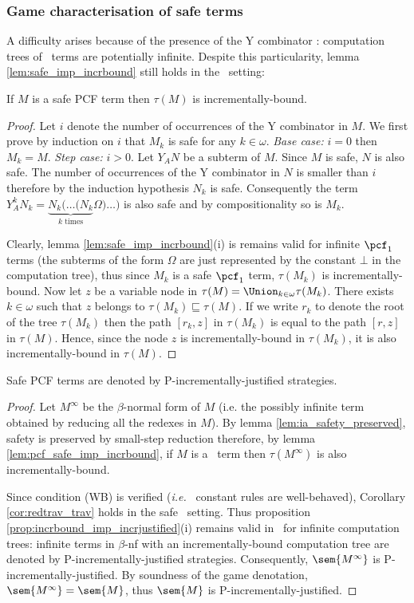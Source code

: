 \subsubsection{Game characterisation of safe terms}

A difficulty arises because of the presence of the Y combinator :
computation trees of \pcf\ terms are potentially infinite. Despite
this particularity, lemma \ref{lem:safe_imp_incrbound} still holds
in the \pcf\ setting:
\begin{lemma} \label{lem:pcf_safe_imp_incrbound} If $M$ is a safe
PCF term then $\tau(M)$ is incrementally-bound.
\end{lemma}
\begin{proof}
Let $i$ denote the number of occurrences of the Y combinator in $M$.
We first prove by induction on $i$ that $M_k$ is safe for any $k\in
\omega$. \emph{Base case:} $i=0$ then $M_k = M$. \emph{Step case:}
$i>0$. Let $Y_A N$ be a subterm of $M$. Since $M$ is safe, $N$ is
also safe. The number of occurrences of the Y combinator in $N$ is
smaller than $i$ therefore by the induction hypothesis $N_k$ is
safe. Consequently the term $Y_A^k N_k = \underbrace{N_k ( \ldots (
N_k}_{k \mbox{ times}} \Omega ) \ldots )$ is also safe and by
compositionality so is $M_k$.

Clearly, lemma \ref{lem:safe_imp_incrbound}(i) is remains valid for infinite
$\pcf_1$ terms (the subterms of the form $\Omega$ are just represented by
the constant $\bot$ in the computation tree), thus since $M_k$
is a safe $\pcf_1$ term, $\tau(M_k)$ is incrementally-bound.
Now let $z$ be a variable node in $\tau(M) =
\Union_{k\in\omega} \tau(M_k)$. There exists $k\in \omega$ such
that $z$ belongs to $\tau(M_k) \sqsubseteq \tau(M)$.
If we write $r_k$ to denote the root of the tree $\tau(M_k)$ then the path $[r_k,z]$ in $\tau(M_k)$ is equal to the path $[r,z]$ in $\tau(M)$.
Hence, since the node $z$ is incrementally-bound in $\tau(M_k)$,
it is also incrementally-bound in $\tau(M)$.
\end{proof}


\begin{theorem}
Safe PCF terms are denoted by P-incrementally-justified strategies.
\end{theorem}
\begin{proof}
Let $M^{\infty}$ be the $\beta$-normal form of $M$ (i.e. the possibly infinite term obtained by reducing all the redexes in $M$). By lemma \ref{lem:ia_safety_preserved}, safety is preserved by small-step reduction therefore, by lemma \ref{lem:pcf_safe_imp_incrbound}, if $M$ is a \pcf\ term then $\tau(M^{\infty})$ is also
incrementally-bound.

Since condition (WB) is verified ({\it i.e.} \pcf\ constant rules
are well-behaved), Corollary \ref{cor:redtrav_trav} holds in the
safe \pcf\ setting. Thus proposition
\ref{prop:incrbound_imp_incrjustified}(i) remains valid in \pcf\ for
infinite computation trees: infinite terms in $\beta$-nf with an
incrementally-bound computation tree are denoted by
P-incrementally-justified strategies. Consequently,
$\sem{M^{\infty}}$ is P-incrementally-justified. By soundness of the
game denotation, $\sem{M^{\infty}} = \sem{M}$, thus $\sem{M}$ is
P-incrementally-justified.
\end{proof}

